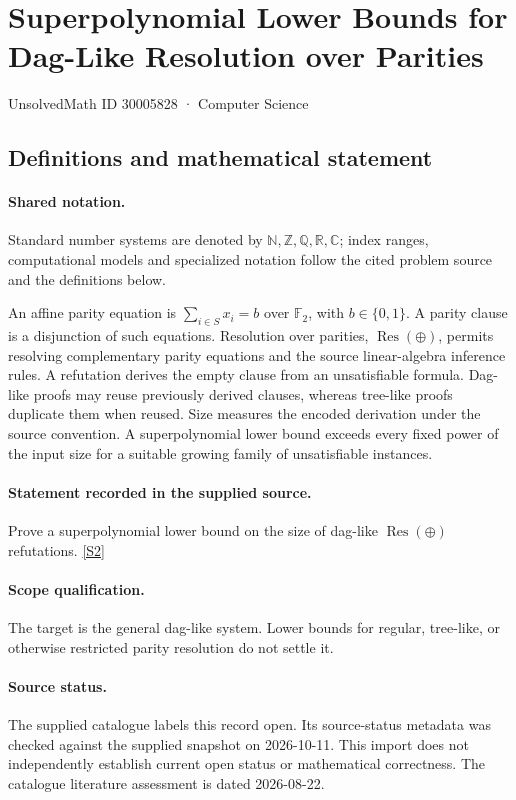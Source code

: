 \documentclass[11pt]{article}
\newcommand{\sref}[2]{\hyperlink{source:#1:#2}{[S#2]}}
\begin{document}
\setcounter{section}{30005827}
\section{Superpolynomial Lower Bounds for Dag-Like Resolution over Parities}\label{30005828}
{\small\sffamily UnsolvedMath ID 30005828 · Computer Science}
\subsection{Definitions and mathematical statement}

\paragraph{Shared notation.}Standard number systems are denoted by $\mathbb N,\mathbb Z,\mathbb Q,\mathbb R,\mathbb C$; index ranges, computational models and specialized notation follow the cited problem source and the definitions below.


An affine parity equation is $\sum_{i\in S}x_i=b$ over $\mathbb F_2$, with $b\in\{0,1\}$. A parity clause is a disjunction of such equations. Resolution over parities, $\operatorname{Res}(\oplus)$, permits resolving complementary parity equations and the source linear-algebra inference rules. A refutation derives the empty clause from an unsatisfiable formula. Dag-like proofs may reuse previously derived clauses, whereas tree-like proofs duplicate them when reused. Size measures the encoded derivation under the source convention. A superpolynomial lower bound exceeds every fixed power of the input size for a suitable growing family of unsatisfiable instances.
\paragraph{Statement recorded in the supplied source.}
Prove a superpolynomial lower bound on the size of dag-like $\operatorname{Res}(\oplus)$ refutations. \sref{30005828}{2}
\paragraph{Scope qualification.}
The target is the general dag-like system. Lower bounds for regular, tree-like, or otherwise restricted parity resolution do not settle it.
\paragraph{Source status.}
The supplied catalogue labels this record open. Its source-status metadata was checked against the supplied snapshot on 2026-10-11. This import does not independently establish current open status or mathematical correctness. The catalogue literature assessment is dated 2026-08-22.
\end{document}
